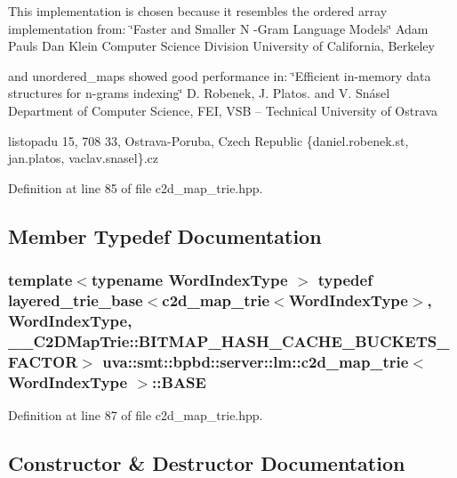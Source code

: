 This implementation is chosen because it resembles the ordered array implementation from\+: \char`\"{}\+Faster and Smaller N -\/\+Gram Language Models\char`\"{} Adam Pauls Dan Klein Computer Science Division University of California, Berkeley

and unordered\+\_\+maps showed good performance in\+: \char`\"{}\+Efficient in-\/memory data structures for n-\/grams indexing\char`\"{} D. Robenek, J. Platos. and V. Snásel Department of Computer Science, F\+E\+I, V\+S\+B – Technical University of Ostrava
\begin{DoxyEnumerate}
\item listopadu 15, 708 33, Ostrava-\/\+Poruba, Czech Republic \{daniel.\+robenek.\+st, jan.\+platos, vaclav.\+snasel\}.cz 
\end{DoxyEnumerate}

Definition at line 85 of file c2d\+\_\+map\+\_\+trie.\+hpp.



\subsection{Member Typedef Documentation}
\hypertarget{classuva_1_1smt_1_1bpbd_1_1server_1_1lm_1_1c2d__map__trie_aed8a7e183010a24bd3dfa02661fb58ca}{}
\subsubsection[{B\+A\+S\+E}]{\setlength{\rightskip}{0pt plus 5cm}template$<$typename Word\+Index\+Type $>$ typedef {\bf layered\+\_\+trie\+\_\+base}$<${\bf c2d\+\_\+map\+\_\+trie}$<${\bf Word\+Index\+Type}$>$, {\bf Word\+Index\+Type}, \+\_\+\+\_\+\+C2\+D\+Map\+Trie\+::\+B\+I\+T\+M\+A\+P\+\_\+\+H\+A\+S\+H\+\_\+\+C\+A\+C\+H\+E\+\_\+\+B\+U\+C\+K\+E\+T\+S\+\_\+\+F\+A\+C\+T\+O\+R$>$ {\bf uva\+::smt\+::bpbd\+::server\+::lm\+::c2d\+\_\+map\+\_\+trie}$<$ {\bf Word\+Index\+Type} $>$\+::{\bf B\+A\+S\+E}}\label{classuva_1_1smt_1_1bpbd_1_1server_1_1lm_1_1c2d__map__trie_aed8a7e183010a24bd3dfa02661fb58ca}


Definition at line 87 of file c2d\+\_\+map\+\_\+trie.\+hpp.



\subsection{Constructor \& Destructor Documentation}
\hypertarget{classuva_1_1smt_1_1bpbd_1_1server_1_1lm_1_1c2d__map__trie_ad3bc6f164ab7cc95f92b4d260ab43b7d}{}

